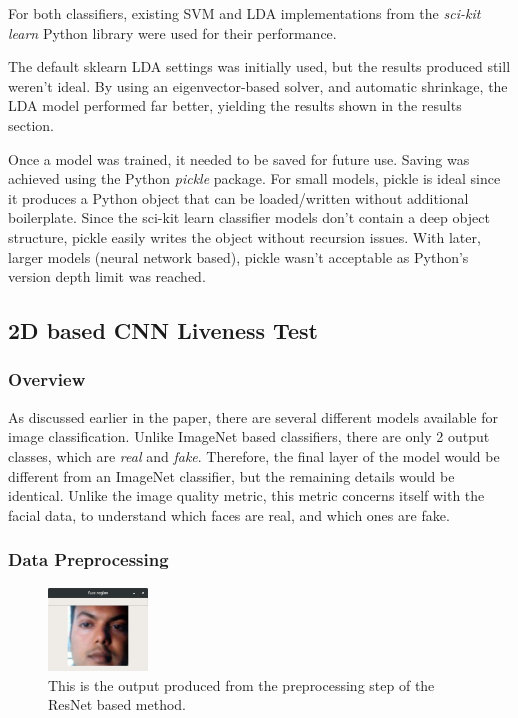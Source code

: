 \documentclass[12pt,a4paper]{article}
\begin{document}
            For both classifiers, existing SVM and LDA implementations from the \emph{sci-kit learn} Python library were used for their performance. 
            
            The default sklearn LDA settings was initially used, but the results produced still weren't ideal. By using an eigenvector-based solver, and automatic shrinkage, the LDA model performed far better, yielding the results
            shown in the results section.

            Once a model was trained, it needed to be saved for future use. Saving was achieved using the Python \emph{pickle} package. For small models, pickle is ideal since it produces a Python object that can be loaded/written without additional boilerplate. Since the sci-kit learn classifier models don't contain a deep object structure, pickle easily writes the object without recursion issues. With later, larger models (neural network based), pickle wasn't acceptable as Python's version depth limit was reached.
    
            
        \subsection{2D based CNN Liveness Test}
            \subsubsection{Overview}
            As discussed earlier in the paper, there are several different models available for image classification. Unlike ImageNet based classifiers, there are only 2 output classes, which are \emph{real} and \emph{fake}.
            Therefore, the final layer of the model would be different from an ImageNet classifier, but the remaining details would be identical. Unlike the image quality metric, this metric concerns itself with the facial data, to understand which faces
            are real, and which ones are fake.

            \subsubsection{Data Preprocessing}
            \begin{figure}
                \centering
                \includegraphics[width=100px]{FaceExtraction.png}
                \caption{This is the output produced from the preprocessing step of the ResNet based method.}
                \label{FaceExtraction}
            \end{figure}
            
\end{document}
